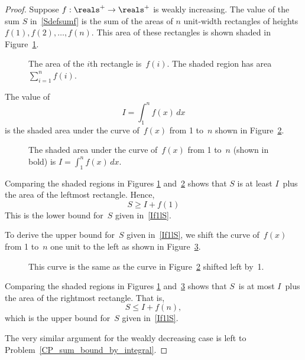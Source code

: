 \begin{proof}
Suppose $f: \reals^+ \to \reals^+$ is weakly increasing.  The value of
the sum $S$ in~\eqref{Sdefsumf} is the sum of the areas of $n$
unit-width rectangles of heights $f(1),f(2),\dots, f(n)$.  This area
of these rectangles is shown shaded in Figure~\ref{fig:9G4}.

\begin{figure}


\caption{The area of the $i$th rectangle is~$f(i)$.  The shaded region
has area $\sum_{i = 1}^n f(i)$.}

\label{fig:9G4}

\end{figure}

The value of
\[
    I = \int_1^n f(x) \, dx
\]
is the shaded area under the curve of~$f(x)$ from 1 to~$n$ shown in
Figure~\ref{fig:9G5}.

\begin{figure}


\caption{The shaded area under the curve of~$f(x)$ from 1 to~$n$
  (shown in bold) is $I = \int_1^n f(x)\, dx$.}

\label{fig:9G5}

\end{figure}

Comparing the shaded regions in Figures \ref{fig:9G4}
and~\ref{fig:9G5} shows that $S$ is at least $I$~plus the area of the
leftmost rectangle.  Hence,
\begin{equation}\label{eqn:9G7}
    S \ge I + f(1)
\end{equation}
This is the lower bound for~$S$ given in~\eqref{If1lS}.

To derive the upper bound for~$S$ given in~\eqref{If1lS}, we shift the
curve of~$f(x)$ from 1 to~$n$ one unit to the left as shown in
Figure~\ref{fig:9G6}.

\begin{figure}


\caption{This curve is the same as the curve in Figure~\ref{fig:9G5}
  shifted left by~1.}

\label{fig:9G6}

\end{figure}

Comparing the shaded regions in Figures \ref{fig:9G4}
and~\ref{fig:9G6} shows that $S$~is at most $I$~plus the area of the
rightmost rectangle.  That is,
\[
S \le I + f(n),
\]
which is the upper bound for~$S$ given in~\eqref{If1lS}.

The very similar argument for the weakly decreasing case is left to
Problem~\ref{CP_sum_bound_by_integral}.

\end{proof}

